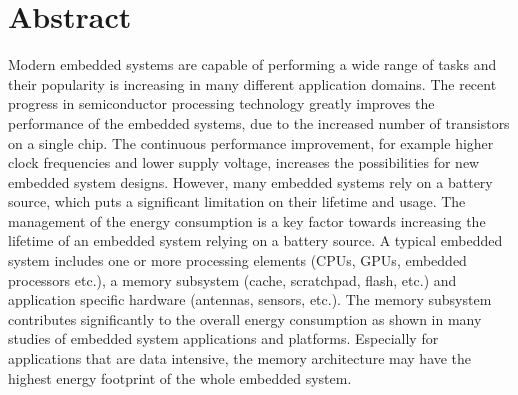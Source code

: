 \section*{\hspace*{\fill} Abstract \hspace*{\fill}}

Modern embedded systems are capable of performing a wide range of tasks and their popularity is increasing in many different application domains.
The recent progress in semiconductor processing technology greatly improves the performance of the embedded systems, due to the increased number of transistors on a single chip.
The continuous performance improvement, for example higher clock frequencies and lower supply voltage, increases the possibilities for new embedded system designs.
However, many embedded systems rely on a battery source, which puts a significant limitation on their lifetime and usage.
The management of the energy consumption is a key factor towards increasing the lifetime of an embedded system relying on a battery source.
A typical embedded system includes one or more processing elements (CPUs, GPUs, embedded processors etc.), a memory subsystem (cache, scratchpad, flash, etc.) and application specific hardware (antennas, sensors, etc.). 
The memory subsystem contributes significantly  to the overall energy consumption as shown in many studies of  embedded system applications and platforms.
Especially for applications that are data intensive, the memory architecture may have the highest energy footprint of the whole embedded system.


